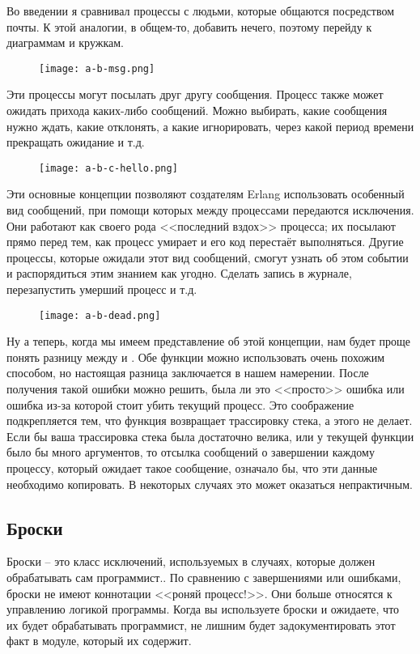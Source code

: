 Во введении я сравнивал процессы с людьми, которые общаются посредством почты. К этой аналогии, в общем\--то, добавить нечего, поэтому перейду к диаграммам и кружкам.
\begin{figure}[h!]
    \texttt{[image: a-b-msg.png]}
\end{figure}

Эти процессы могут посылать друг другу сообщения.
Процесс также может ожидать прихода каких\--либо сообщений.
Можно выбирать, какие сообщения нужно ждать, какие отклонять, а какие игнорировать, через какой период времени прекращать ожидание и т.д.
\begin{figure}[h!]
    \texttt{[image: a-b-c-hello.png]}
\end{figure}

Эти основные концепции позволяют создателям Erlang использовать особенный вид сообщений, при помощи которых между процессами передаются исключения.
Они работают как своего рода <<последний вздох>> процесса; их посылают прямо перед тем, как процесс умирает и его код перестаёт выполняться.
Другие процессы, которые ожидали этот вид сообщений, смогут узнать об этом событии и распорядиться этим знанием как угодно.
Сделать запись в журнале, перезапустить умерший процесс и т.д.
\begin{figure}[h!]
    \texttt{[image: a-b-dead.png]}
\end{figure}

Ну а теперь, когда мы имеем представление об этой концепции, нам будет проще понять разницу между  и .
Обе функции можно использовать очень похожим способом, но настоящая разница заключается в нашем намерении.
После получения такой ошибки можно решить, была ли это <<просто>> ошибка или ошибка из\--за которой стоит убить текущий процесс.
Это соображение подкрепляется тем, что функция  возвращает трассировку стека, а  этого не делает.
Если бы ваша трассировка стека была достаточно велика, или у текущей функции было бы много аргументов, то отсылка сообщений о завершении каждому процессу, который ожидает такое сообщение, означало бы, что эти данные необходимо копировать. В некоторых случаях это может оказаться непрактичным.
\subsection{Броски}
\label{throws}
Броски \--- это класс исключений, используемых в случаях, которые должен обрабатывать сам программист..
По сравнению с завершениями  или ошибками, броски не имеют коннотации <<роняй процесс!>>.
Они больше относятся к управлению логикой программы.
Когда вы используете броски и ожидаете, что их будет обрабатывать программист, не лишним будет задокументировать этот факт в модуле, который их содержит.

